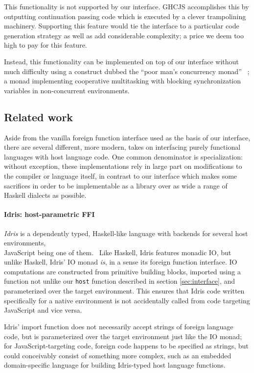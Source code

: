 \documentclass[preprint]{sigplanconf}
\begin{document}
This functionality is not supported by our interface. GHCJS accomplishes this
by outputting continuation passing code which is executed by a clever
trampolining machinery. Supporting this feature would tie the interface to
a particular code generation strategy as well as add considerable complexity;
a price we deem too high to pay for this feature.

Instead, this functionality can be implemented on top of our interface without
much difficulty using a construct dubbed the ``poor man's concurrency monad''
\ \cite{poormansconcurrencymonad}; a monad implementing cooperative
multitasking with blocking synchronization variables in non-concurrent
environments.

\subsection{Related work}\label{sec:related}
Aside from the vanilla foreign function interface used as the basis of our
interface, there are several different, more modern, takes on interfacing
purely functional languages with host language code.
One common denominator is specialization: without exception, these
implementations rely in large part on modifications to the compiler or
language itself, in contrast to our interface which makes some sacrifices
in order to be implementable as a library over as wide a range of Haskell
dialects as possible.

\paragraph{Idris: host-parametric FFI}
\emph{Idris} is a dependently typed, Haskell-like language with backends for
several host environments,\\
JavaScript being one of them.\ \cite{idris}
Like Haskell, Idris features monadic IO, but unlike Haskell, Idris' IO monad
\emph{is}, in a sense its foreign function interface.
IO computations are constructed from primitive building blocks, imported using
a function not unlike our \lstinline!host! function described in section
\ref{sec:interface}, and parameterized over the target environment.
This ensures that Idris code written specifically for a native environment
is not accidentally called from code targeting JavaScript and vice versa.

Idris' import function does not necessarily accept strings of foreign
language code, but is parameterized over the target environment just like the
IO monad; for JavaScript-targeting code, foreign code happens to be specified
as strings, but could conceivably consist of something more complex, such as
an embedded domain-specific language for building Idris-typed host language
functions.
\end{document}
